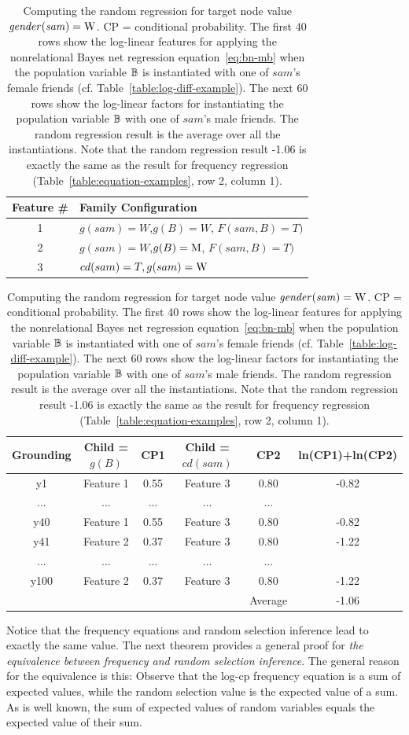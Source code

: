 \documentclass[twoside,11pt]{article}
\newcommand{\keypoint}[1]{{\em #1}}
\begin{document}
\begin{table}
\vspace{-1cm}
\begin{center}
\begin{tabular}{c|l}
Feature \#&Family Configuration\\\hline
1 &$g(sam) = W$,$g(B) = W$, $F(sam,B) = T)$  \\
2 & $g(sam) = W$,$g(B) = \mathrm{M}$, $F(sam,B) = T)$\\
 3 & $cd(sam) = T,g(sam)=\mathrm{W}$ \\\hline
\end{tabular}
\end{center}



\begin{tabular}{c|cc|cc|c}
Grounding & Child = $g(B)$  & CP1 & Child = $cd(sam)$ & CP2 &ln(CP1)+ln(CP2) \\\hline
y1 & Feature 1&0.55 & Feature 3  & 0.80 & -0.82 \\
... & ... & ... & ... & ... \\
y40 & Feature 1 & 0.55& Feature 3  & 0.80 & -0.82 \\
y41 & Feature 2& 0.37 & Feature 3  & 0.80 & -1.22 \\
... & ... & ... & ... & ... \\
y100 & Feature 2 & 0.37& Feature 3 & 0.80 & -1.22 \\
 &  &  &  & Average & -1.06 \\
\end{tabular}
\caption{Computing the random regression for target node value $\it{gender}(sam) = \mathrm{W}$. CP = conditional probability. The first 40 rows show the log-linear features for applying the nonrelational Bayes net regression equation~\ref{eq:bn-mb} when the population variable $\mathbb{B}$ is instantiated with one of $sam$'s female friends (cf. Table~\ref{table:log-diff-example}). The next 60 rows show the log-linear factors for instantiating the population variable $\mathbb{B}$ with one of $sam$'s male friends. The random regression result is the average over all the instantiations. Note that the random regression result -1.06 is exactly the same as the result for frequency regression (Table~\ref{table:equation-examples}, row 2, column 1). }
\label{table:random-regress}
\end{table}


Notice that the frequency equations and random selection inference lead to exactly the same value. The next theorem provides a general proof for \keypoint{the  equivalence between frequency and random selection inference}.
The general reason for the equivalence is this: Observe that the log-cp frequency equation is a sum of expected values, while the random selection value is the expected value of a sum. As is well known, the sum of expected values of random variables equals the expected value of their sum.
\end{document}
